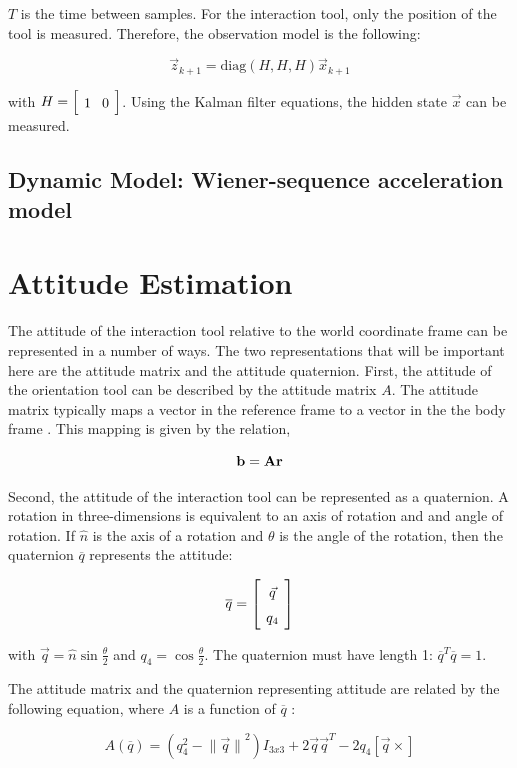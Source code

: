 \documentclass{article}
\newcommand{\mat}[2][ccccccccccccccccccccccccccccccccccccccccccccc]{\left[
        \arraycolsep=4pt\def\arraystretch{1.5}
        \begin{array}{#1} #2 \\ 
        \end{array} 
        \right]}
\begin{document}
\begin{flushleft}
$T$ is the time between samples. For the interaction tool, only the position of the tool is measured. Therefore, the observation model is the following: 

$$ \vec{z}_{k+1} = \textrm{diag}(H, H, H) \vec{x}_{k+1} $$

with $ H = \mat{ 1 & 0 } $. Using the Kalman filter equations, the hidden state $\vec{x}$ can be measured. 


\subsection{Dynamic Model: Wiener-sequence acceleration model}


\section{Attitude Estimation}

The attitude of the interaction tool relative to the world coordinate frame can be represented in a number of ways. The two representations that will be important here are the attitude matrix and the attitude quaternion. First, the attitude of the orientation tool can be described by the attitude matrix $A$. The attitude matrix typically maps a vector in the reference frame to a vector in the the body frame \cite{Markley2007}. This mapping is given by the relation, 

\[ \bf{b} = A \bf{r} \]

Second, the attitude of the interaction tool can be represented as a quaternion. A rotation in three-dimensions is equivalent to an axis of rotation and and angle of rotation. If $\hat{n}$ is the axis of a rotation and $\theta$ is the angle of the rotation, then the quaternion $\overline{q}$ represents the attitude: 

\[ \overline{q} = \mat{\vec{q} \\ q_4} \] 

with $\vec{q} = \hat{n} \sin{\frac{\theta}{2}}$ and $q_4 = \cos{\frac{\theta}{2}}$. The quaternion must have length 1: $\overline{q}^T \overline{q} = 1$. 

The attitude matrix and the quaternion representing attitude are related by the following equation, where $A$ is a function of $\overline{q}$ \cite{Shuster1982}: 

\[ A(\overline{q}) = (q_4^2 - {\| \vec{q} \|}^2) I_{3x3} + 2 \vec{q}\vec{q}^T - 2 q_4 [\vec{q}\times] \]


\end{flushleft}
\end{document}
